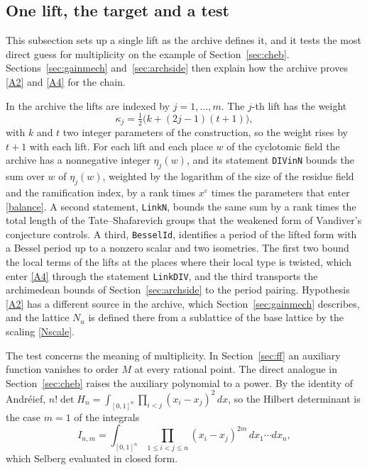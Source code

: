 \documentclass[11pt,letterpaper]{article}
\numberwithin{equation}{section}
\begin{document}
\subsection{One lift, the target and a test}\label{sec:lift}

This subsection sets up a single lift as the archive defines it, and it tests the most direct guess for multiplicity on the example of Section~\ref{sec:cheb}. Sections~\ref{sec:gainmech} and~\ref{sec:archside} then explain how the archive proves \eqref{A2} and \eqref{A4} for the chain.

In the archive the lifts are indexed by $j=1,\dots,m$. The $j$-th lift has the weight
\[
\kappa_j=\tfrac12\big(k+(2j-1)(t+1)\big),
\]
with $k$ and $t$ two integer parameters of the construction, so the weight rises by $t+1$ with each lift. For each lift and each place $w$ of the cyclotomic field the archive has a nonnegative integer $\eta_j(w)$, and its statement \texttt{DIVinN} bounds the sum over $w$ of $\eta_j(w)$, weighted by the logarithm of the size of the residue field and the ramification index, by a rank times $x^{\varepsilon}$ times the parameters that enter \eqref{balance}. A second statement, \texttt{LinkN}, bounds the same sum by a rank times the total length of the Tate--Shafarevich groups that the weakened form of Vandiver's conjecture controls. A third, \texttt{BesselId}, identifies a period of the lifted form with a Bessel period up to a nonzero scalar and two isometries. The first two bound the local terms of the lifts at the places where their local type is twisted, which enter \eqref{A4} through the statement \texttt{LinkDIV}, and the third transports the archimedean bounds of Section~\ref{sec:archside} to the period pairing. Hypothesis \eqref{A2} has a different source in the archive, which Section~\ref{sec:gainmech} describes, and the lattice $N_u$ is defined there from a sublattice of the base lattice by the scaling \eqref{Nscale}.

The test concerns the meaning of multiplicity. In Section~\ref{sec:ff} an auxiliary function vanishes to order $M$ at every rational point. The direct analogue in Section~\ref{sec:cheb} raises the auxiliary polynomial to a power. By the identity of Andr\'eief, $n!\det H_n=\int_{[0,1]^n}\prod_{i<j}(x_i-x_j)^2\,dx$, so the Hilbert determinant is the case $m=1$ of the integrals
\[
I_{n,m}=\int_{[0,1]^n}\prod_{1\le i<j\le n}(x_i-x_j)^{2m}\,dx_1\cdots dx_n ,
\]
which Selberg \cite{selberg} evaluated in closed form.
\end{document}
